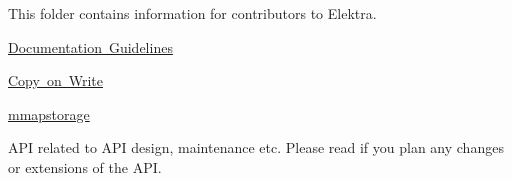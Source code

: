 \label{doc_contrib_README_md_md_doc_contrib_README}%
%
This folder contains information for contributors to Elektra.


\begin{DoxyItemize}
\item \mbox{\hyperlink{doc_contrib_documentation_md}{Documentation Guidelines}}
\item \mbox{\hyperlink{doc_contrib_copy_on_write_md}{Copy on Write}}
\item \mbox{\hyperlink{doc_contrib_mmapstorage_md}{mmapstorage}}
\item API related to API design, maintenance etc. Please read if you plan any changes or extensions of the API. 
\end{DoxyItemize}